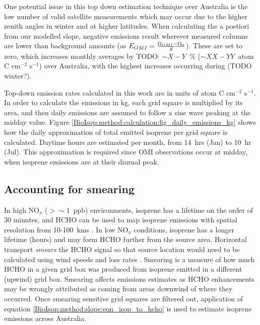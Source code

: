     
    One potential issue in this top down estimation technique over Australia is the low number of valid satellite measurements which may occur due to the higher zenith angles in winter and at higher latitudes.
    When calculating the a postiori from our modelled slope, negative emissions result wherever measured columns are lower than background amounts (as $E_{OMI} = \frac{\Omega_{OMI} - \Omega_0}{S}$).
    These are set to zero, which increases monthly averages by TODO: $\sim X-Y$~\% ($\sim XX - YY$~atom C cm$^{-2}$ s$^{-1}$) over Australia, with the highest increases occurring during (TODO winter?).
    
    Top-down emission rates calculated in this work are in units of atom C cm$^{-2}$ s$^{-1}$.
    In order to calculate the emissions in kg, each grid square is multiplied by its area, and then daily emissions are assumed to follow a sine wave peaking at the midday value.
    Figure \ref{BioIsop:method:calculation:fig_daily_emissions_kg} shows how the daily approximation of total emitted isoprene per grid square is calculated.
    Daytime hours are estimated per month, from 14~hrs (Jan) to 10~hr (Jul).
    This approximation is required since OMI observations occur at midday, when isoprene emissions are at their diurnal peak.
    
  
  
  \subsection{Accounting for smearing}
    \label{BioIsop:method:smearing}
    
    In high NO$_x$ ($ > \sim 1 $~ppb) environments, isoprene has a lifetime on the order of 30 minutes, and HCHO can be used to map isoprene emissions with spatial resolution from 10-100~kms \parencite{Palmer2003}.
    In low NO$_x$ conditions, isoprene has a longer lifetime (hours) and may form HCHO further from the source area.
    Horizontal transport \textit{smears} the HCHO signal so that source location would need to be calculated using wind speeds and loss rates \parencite{Palmer2001,Palmer2003}.
    Smearing is a measure of how much HCHO in a given grid box was produced from isoprene emitted in a different (upwind) grid box.
    Smearing affects emissions estimates as HCHO enhancements may be wrongly attributed as coming from areas downwind of where they occurred.
    Once smearing sensitive grid squares are filtered out, application of equation \ref{BioIsop:method:slope:eqn_isop_to_hcho} is used to estimate isoprene emissions across Australia.
    
